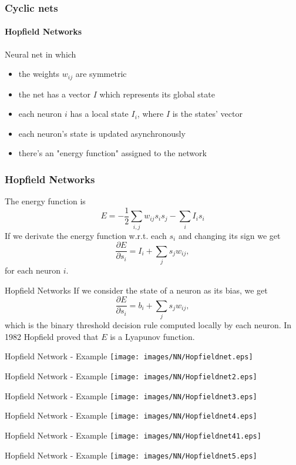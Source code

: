 \documentclass{beamer}
\begin{document}
\begin{frame}
\frametitle{Cyclic nets}
\framesubtitle{Hopfield Networks}
\begin{definition}
Neural net in which
\begin{itemize}
	\item the weights $w_{ij}$ are symmetric
	\item the net has a vector $I$ which represents its global state
	\item each neuron $i$ has a local state $I_i$, where $I$ is the states' vector
	\item each neuron's state is updated asynchronously
	\item there's an "energy function" assigned to the network
\end{itemize}
\end{definition}
\end{frame}

\begin{frame}
	\frametitle{Hopfield Networks}
	The energy function is
	\[E=-\frac{1}{2}\sum_{i,j}w_{ij}s_is_j-\sum_iI_is_i \]
	If we derivate the energy function w.r.t. each $s_i$ and changing its sign we get
	\[
		\frac{\partial E}{\partial s_i} = I_i + \sum_{j}s_jw_{ij}, 
	\]
	for each neuron $i.$
\end{frame}

\begin{frame}{Hopfield Networks}
	If we consider the state of a neuron as its bias, we get
		\[
			\frac{\partial E}{\partial s_i} = b_i + \sum_{j}s_jw_{ij},
		\]
		which is the binary threshold decision rule computed locally by each neuron.
		In 1982 Hopfield proved that $E$ is a Lyapunov function. 
\end{frame}

\begin{frame}{Hopfield Network - Example}
	\texttt{[image: images/NN/Hopfieldnet.eps]}
\end{frame}

\begin{frame}{Hopfield Network - Example}
\texttt{[image: images/NN/Hopfieldnet2.eps]}
\end{frame}
\begin{frame}{Hopfield Network - Example}
\texttt{[image: images/NN/Hopfieldnet3.eps]}
\end{frame}
\begin{frame}{Hopfield Network - Example}
\texttt{[image: images/NN/Hopfieldnet4.eps]}
\end{frame}
\begin{frame}{Hopfield Network - Example}
\texttt{[image: images/NN/Hopfieldnet41.eps]}
\end{frame}
\begin{frame}{Hopfield Network - Example}
\texttt{[image: images/NN/Hopfieldnet5.eps]}
\end{frame}
\end{document}
